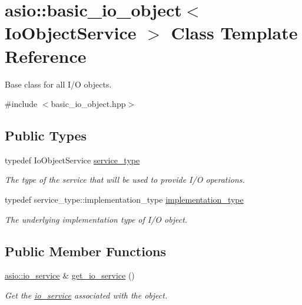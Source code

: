 \hypertarget{classasio_1_1basic__io__object}{}\section{asio\+:\+:basic\+\_\+io\+\_\+object$<$ Io\+Object\+Service $>$ Class Template Reference}
\label{classasio_1_1basic__io__object}


Base class for all I/\+O objects.  




{\ttfamily \#include $<$basic\+\_\+io\+\_\+object.\+hpp$>$}

\subsection*{Public Types}
\begin{DoxyCompactItemize}
\item 
typedef Io\+Object\+Service \hyperlink{classasio_1_1basic__io__object_aee6c059b568e190966f1307cc21a264d}{service\+\_\+type}
\begin{DoxyCompactList}\small\item\em The type of the service that will be used to provide I/\+O operations. \end{DoxyCompactList}\item 
typedef service\+\_\+type\+::implementation\+\_\+type \hyperlink{classasio_1_1basic__io__object_a36e6f136c8c1249242e81597c34d8d29}{implementation\+\_\+type}
\begin{DoxyCompactList}\small\item\em The underlying implementation type of I/\+O object. \end{DoxyCompactList}\end{DoxyCompactItemize}
\subsection*{Public Member Functions}
\begin{DoxyCompactItemize}
\item 
\hyperlink{classasio_1_1io__service}{asio\+::io\+\_\+service} \& \hyperlink{classasio_1_1basic__io__object_a0b873ee7c623f0c37404fd0884765ab9}{get\+\_\+io\+\_\+service} ()
\begin{DoxyCompactList}\small\item\em Get the \hyperlink{classasio_1_1io__service}{io\+\_\+service} associated with the object. \end{DoxyCompactList}\end{DoxyCompactItemize}
